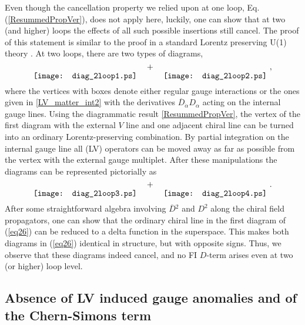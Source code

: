 \documentclass[12pt]{revtex4}
\begin{document}
Even though the cancellation
property we relied upon at one loop, Eq. (\ref{ResummedPropVer}), does
not apply here,  luckily, one can show that at two (and higher) loops
the effects of all such possible insertions still cancel. The proof of
this statement is similar to the proof in a standard Lorentz
preserving U(1) theory \cite{Fischler:1981zk}. At two loops, there are
two types of diagrams, 
%
\begin{equation}
\raisebox{-2.5ex}{\texttt{[image: diag\_2loop1.ps]}}
\quad + \quad 
\raisebox{-2.5ex}{\texttt{[image: diag\_2loop2.ps]}}
~,
\end{equation} 
%
where the vertices with boxes denote either regular gauge interactions or
the ones given in \eqref{LV_matter_int2} with the derivatives
$\overline{D}_{\dot\alpha} D_\alpha$ acting on the internal gauge lines. 
Using the diagrammatic result \eqref{ResummedPropVer}, the vertex of 
the first diagram with the external $V$ line and one adjacent chiral
line can be turned into an ordinary Lorentz-preserving combination. 
By partial integration on
the internal gauge line all (LV) operators can be moved away as far as
possible from the vertex with the external gauge multiplet. After
these manipulations the diagrams can be represented pictorially as  
%
\begin{equation}
\raisebox{-2.5ex}{\texttt{[image: diag\_2loop3.ps]}}
\quad + \quad 
\raisebox{-2.5ex}{\texttt{[image: diag\_2loop4.ps]}}
~.
\label{eq26}
\end{equation} 
%
After some straightforward algebra involving $\overline{D}{}^2$ and 
$D^2$ along the chiral field propagators, one can show that 
the ordinary chiral line in the first diagram of (\ref{eq26}) 
can be reduced to a delta function in the superspace.
This makes both diagrams in (\ref{eq26}) identical in structure, but
with opposite signs. Thus, we observe that these diagrams indeed
cancel, and no FI $D$-term arises even at two (or higher) loop level.  


\subsection{Absence of LV induced gauge anomalies and of the Chern-Simons term}
\label{noAnomaly}
\end{document}
